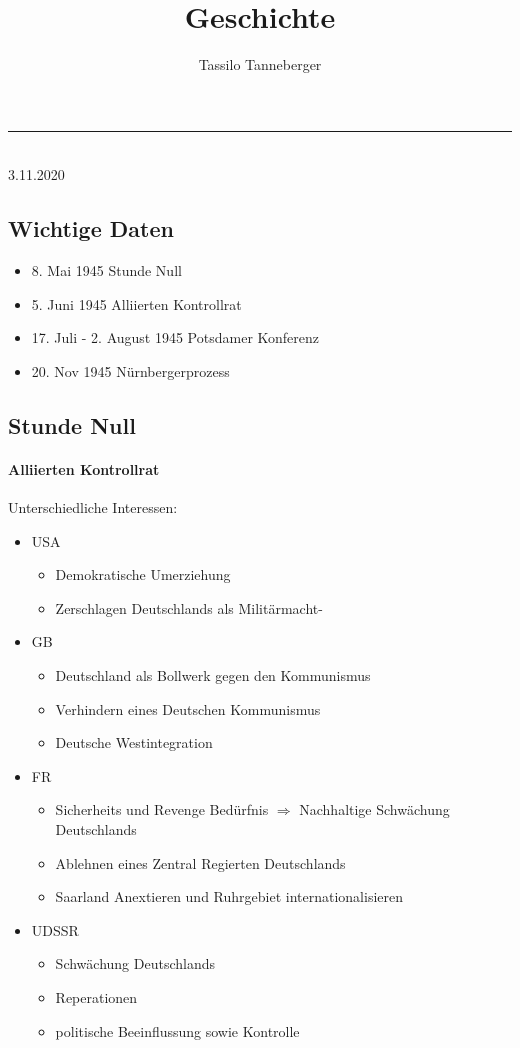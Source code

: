 \documentclass[12pt]{article}
\title{Geschichte}
\author{Tassilo Tanneberger}
\makeatletter
\newcommand{\linia}{\rule{\linewidth}{1pt}}
\renewcommand{\maketitle}{
\begin{center}
\huge \@title
\end{center}
\linia\\
{\large\@author\hfill 3.11.2020\\}}
\makeatother
\begin{document}
\maketitle

\subsection*{Wichtige Daten}


\begin{itemize}
	\item 8. Mai 1945 Stunde Null 
	\item 5. Juni 1945 Alliierten Kontrollrat 
	\item 17. Juli - 2. August 1945 Potsdamer Konferenz
	\item 20. Nov 1945 Nürnbergerprozess 
\end{itemize}

\subsection*{Stunde Null}

\paragraph*{Alliierten Kontrollrat}
Unterschiedliche Interessen:
\begin{itemize}
	\item USA 
	\begin{itemize}
		\item Demokratische Umerziehung
		\item Zerschlagen Deutschlands als Militärmacht-
	\end{itemize}
	
	\item GB
	\begin{itemize}
		\item Deutschland als Bollwerk gegen den Kommunismus
		\item Verhindern eines Deutschen Kommunismus
		\item Deutsche Westintegration
	\end{itemize}
	
	\item FR
	\begin{itemize}
		\item Sicherheits und Revenge Bedürfnis $ \Rightarrow $ Nachhaltige Schwächung Deutschlands 
		\item Ablehnen eines Zentral Regierten Deutschlands
		\item Saarland Anextieren und Ruhrgebiet internationalisieren
	\end{itemize}
	
	\item UDSSR
	\begin{itemize}
		\item Schwächung Deutschlands
		\item Reperationen
		\item politische Beeinflussung sowie Kontrolle 
	\end{itemize}
\end{itemize}
\end{document}

